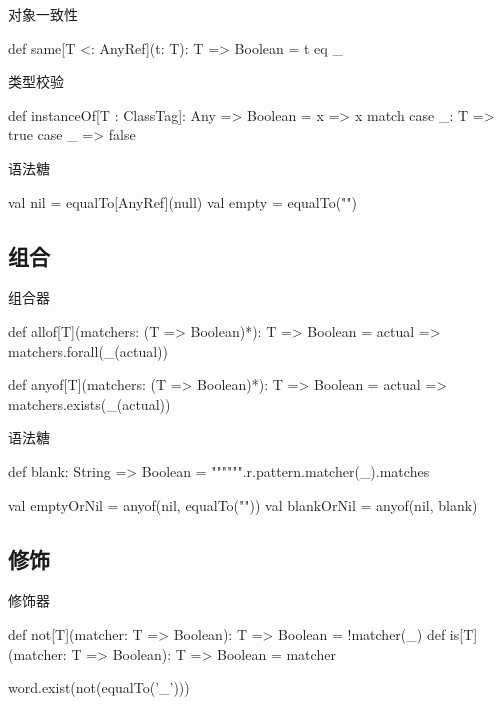 \begin{frame}[fragile]{对象一致性}
  \begin{scala}
def same[T <: AnyRef](t: T): T => Boolean = t eq _
  \end{scala}
\end{frame}

\begin{frame}[fragile]{类型校验}
  \begin{scala}
def instanceOf[T : ClassTag]: Any => Boolean = x =>
  x match {
    case _: T => true
    case _    => false
  }
  \end{scala}
\end{frame}

\begin{frame}[fragile]{语法糖}
  \begin{scala}
val nil   = equalTo[AnyRef](null)
val empty = equalTo("")
  \end{scala}
\end{frame}

\subsection{组合}

\begin{frame}[fragile]{组合器}
  \begin{scala}
def allof[T](matchers: (T => Boolean)*): T => Boolean =
  actual => matchers.forall(_(actual))

def anyof[T](matchers: (T => Boolean)*): T => Boolean =
  actual => matchers.exists(_(actual))
  \end{scala}
\end{frame}

\begin{frame}[fragile]{语法糖}
  \begin{scala}
def blank: String => Boolean = 
  """\s*""".r.pattern.matcher(_).matches

val emptyOrNil = anyof(nil, equalTo(""))
val blankOrNil = anyof(nil, blank)
  \end{scala}
\end{frame}

\subsection{修饰}

\begin{frame}[fragile]{修饰器}
  \begin{scala}
def not[T](matcher: T => Boolean): T => Boolean = !matcher(_)
def is[T](matcher: T => Boolean):  T => Boolean = matcher

word.exist(not(equalTo('_')))
  \end{scala}
\end{frame}

